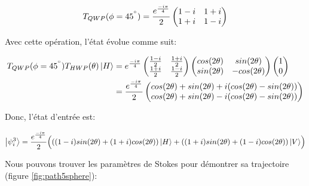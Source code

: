 \begin{equation}
    T_{QWP}(\phi = 45^{\degree}) = \frac{e^{\frac{-i\pi}{4}}}{2}\begin{pmatrix}
        1-i & 1+i \\
        1+i & 1-i
    \end{pmatrix}
\end{equation}

\begin{onehalfspace}
    \noindent Avec cette opération, l'état évolue comme suit:
\end{onehalfspace}

\begin{align}
    T_{QWP}(\phi = 45^{\degree})T_{HWP}(\theta)\ket{H} &= 
    e^{\frac{-i\pi}{4}}\begin{pmatrix} 
        \frac{1-i}{2} & \frac{1+i}{2} \\
        \frac{1+i}{2} & \frac{1-i}{2}
    \end{pmatrix} 
    \begin{pmatrix}
        cos(2\theta) & sin(2\theta)\\
        sin(2\theta) & -cos(2\theta)
    \end{pmatrix} \begin{pmatrix}
        1\\0
    \end{pmatrix}\\
    &= \frac{e^{\frac{-i\pi}{4}}}{2}\begin{pmatrix}
        cos(2\theta) + sin(2\theta) + i(cos(2\theta) - sin(2\theta))\\cos(2\theta) + sin(2\theta) -i(cos(2\theta)-sin(2\theta))
    \end{pmatrix}
\end{align}

\begin{onehalfspace}
    \noindent Donc, l'état d'entrée est: 
\end{onehalfspace}

\begin{equation}
    \ket{\psi_{i}^{3}} = \frac{e^{\frac{-i\pi}{4}}}{2}\Bigl(((1-i)sin(2\theta) + (1+i)cos(2\theta))\ket{H} + ((1+i)sin(2\theta) + (1-i)cos(2\theta))\ket{V}\Bigr)
    \label{eq:state3}
\end{equation}

\begin{onehalfspace}
    \noindent Nous pouvons trouver les paramètres de Stokes pour démontrer sa 
    trajectoire (figure \ref{fig:path5sphere}):
\end{onehalfspace}

